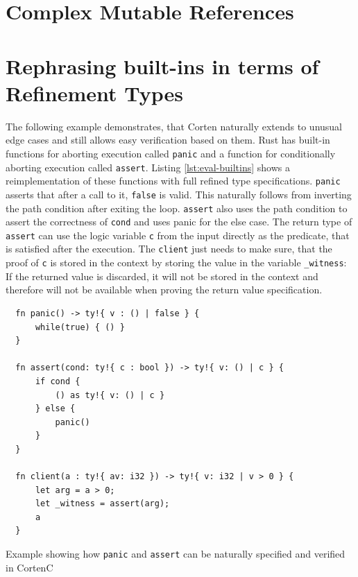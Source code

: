\documentclass{book}
\newcommand{\code}[1]{\texttt{#1}}
\theoremstyle{definition}
\begin{document}
\label{subsec:evaluation-complex-mutable-ref}\section{Complex Mutable References}



\section{Rephrasing built-ins in terms of Refinement Types}

The following example demonstrates, that Corten naturally extends to unusual edge cases and still allows easy verification based on them.
Rust has built-in functions for aborting execution \- called \code{panic} \- and a function for conditionally aborting execution \- called \code{assert}. Listing \ref{lst:eval-builtins} shows a reimplementation of these functions with full refined type specifications. 
\code{panic} asserts that after a call to it, \code{false} is valid. This naturally follows from inverting the path condition after exiting the loop. 
\code{assert} also uses the path condition to assert the correctness of \code{cond} and uses panic for the else case. The return type of \code{assert} can use the logic variable \code{c} from the input directly as the predicate, that is satisfied after the execution.
The \code{client} just needs to make sure, that the proof of \code{c} is stored in the context by storing the value in the variable \code{\_witness}: If the returned value is discarded, it will not be stored in the context and therefore will not be available when proving the return value specification.


\begin{listing}[ht]
  \begin{verbatim}
  fn panic() -> ty!{ v : () | false } {
      while(true) { () }
  }

  fn assert(cond: ty!{ c : bool }) -> ty!{ v: () | c } {
      if cond {
          () as ty!{ v: () | c }
      } else {
          panic()
      }
  }

  fn client(a : ty!{ av: i32 }) -> ty!{ v: i32 | v > 0 } {
      let arg = a > 0;
      let _witness = assert(arg);
      a
  }
  \end{verbatim}
  \caption{Example showing how \code{panic} and \code{assert} can be naturally specified and verified in CortenC}
  \label{lst:eval-builtins}
\end{listing}
\end{document}
